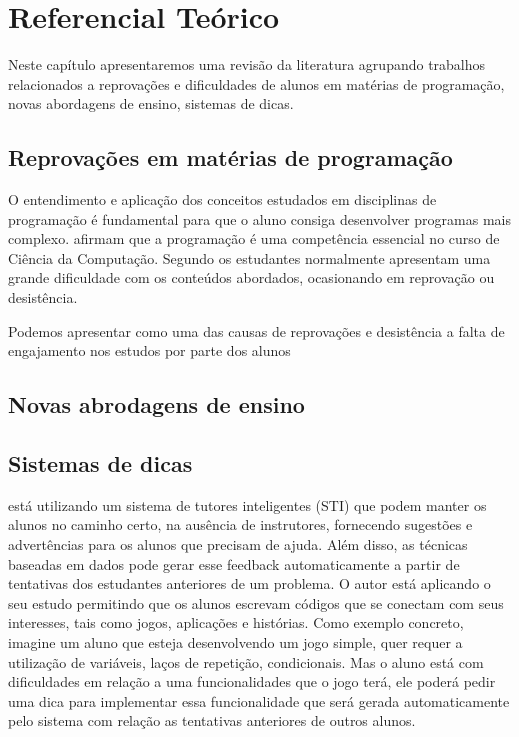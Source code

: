 \chapter{Referencial Teórico}

Neste capítulo apresentaremos uma revisão da literatura agrupando trabalhos relacionados a reprovações e dificuldades de alunos em matérias de programação, novas abordagens de ensino, sistemas de dicas. 

\section{Reprovações em matérias de programação}

O entendimento e aplicação dos conceitos estudados em disciplinas de programação é fundamental para que o aluno consiga desenvolver programas mais complexo.  afirmam que a programação é uma competência essencial no curso de Ciência da Computação. Segundo  os estudantes normalmente apresentam uma grande dificuldade com os conteúdos abordados, ocasionando em reprovação ou desistência.

Podemos apresentar como uma das causas de reprovações e desistência a falta de engajamento nos estudos por parte dos alunos \cite{Sinclair:2015:MSE:2729094.2742586}

\section{Novas abrodagens de ensino}

\section{Sistemas de dicas}

 está utilizando um sistema de tutores inteligentes (STI) que podem manter os alunos no caminho certo, na ausência de instrutores, fornecendo sugestões e advertências para os alunos que precisam de ajuda. Além disso, as técnicas baseadas em dados pode gerar esse feedback automaticamente a partir de tentativas dos estudantes anteriores de um problema. O autor está aplicando o seu estudo permitindo que os alunos escrevam códigos que se conectam com seus interesses, tais como jogos, aplicações e histórias. Como exemplo concreto, imagine um aluno que esteja desenvolvendo um jogo simple, quer requer a utilização de variáveis, laços de repetição, condicionais. Mas o aluno está com dificuldades em relação a uma funcionalidades que o jogo terá, ele poderá pedir uma dica para implementar essa funcionalidade que será gerada automaticamente pelo sistema com relação as tentativas anteriores de outros alunos.

